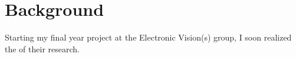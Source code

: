\chapter{Background}
Starting my final year project at the Electronic Vision(s) group, I soon realized the  of their research. 